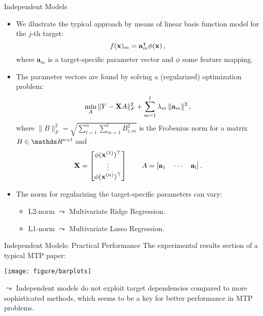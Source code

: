 \documentclass[11pt,compress,t,notes=noshow, xcolor=table]{beamer}
\newcommand{\ba}{\mathbf{a}}
\begin{document}
\begin{frame}{Independent Models}
%	
	\footnotesize
%	
	\begin{itemize}
%		
		\item 	We illustrate the typical approach by means of linear basis function model for the $j$-th target: 
		\begin{equation*}
			f(\xv)_m = \ba_m^\intercal \phi(\xv) \,,
			\label{eq:binrel}
		\end{equation*}
%	
		where $\ba_m$ is a target-specific parameter vector and $\phi$ some feature mapping.
%
		\item The parameter vectors are found by solving a (regularized) optimization problem: 
%		
		\begin{equation*}
			\label{eq:multiridge}
			\min_A \|Y - \Xmat A \|^2_F +  \sum_{m=1}^l \lambda_m \,\|\ba_m\|^2 \,,
		\end{equation*}
%	
		where $ \| B \|^2_F  = \sqrt{ \sum_{i=1}^n \sum_{m=1}^l B_{i,m}^2 } $ is the Frobenius norm for a matrix $B \in \R^{n \times l}$ and 
%		
		\begin{equation*}
			\label{eq:notation}
			\Xmat = \begin{bmatrix} \phi(\xv^{(1)})^\top \\ \vdots \\ \phi(\xv^{(n)})^\top \end{bmatrix} \qquad A = [\ba_1 \quad \cdots \quad \ba_l] \,.
		\end{equation*}
%
		\item The norm for regularizing the target-specific parameters can vary:
%		
			\begin{itemize} \footnotesize
%				
				\item L2-norm $\leadsto$ Multivariate Ridge Regression.
%				
				\item L1-norm $\leadsto$ Multivariate Lasso Regression.
%				
%				
			\end{itemize}
%	
	\end{itemize}
%
\end{frame}

\begin{frame}{Independent Models: Practical Performance}
%	
	The experimental results section of a typical MTP paper: 
%	
	\begin{center}
		\texttt{[image: figure/barplots]} \\
	\end{center}
%
	$\leadsto$ Independent models do not exploit target dependencies compared to more sophisticated methods, which seems to be a key for better performance in MTP problems.
%	
\end{frame}
\end{document}
